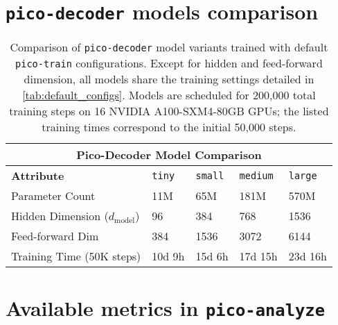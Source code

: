 \section{\texttt{pico-decoder} models comparison}
\begin{table}[h!]
\centering
\renewcommand{\arraystretch}{1}
\begin{tabular}{|p{}||p{}|p{}|p{}|p{}|}
\hline
\multicolumn{5}{|c|}{\textbf{Pico-Decoder Model Comparison}} \\
\hline
\textbf{Attribute} & \texttt{tiny} & \texttt{small} & \texttt{medium} & \texttt{large} \\
\hline
Parameter Count & 11M & 65M & 181M & 570M \\
Hidden Dimension ($d_{\text{model}}$) & 96 & 384 & 768 & 1536 \\
Feed-forward Dim & 384 & 1536 & 3072 & 6144 \\
Training Time (50K steps) & 10d 9h & 15d 6h & 17d 15h & 23d 16h \\
\hline
\end{tabular}
\vspace{0.5em}
\caption{Comparison of \texttt{pico-decoder} model variants trained with default \texttt{pico-train} configurations. Except for hidden and feed-forward dimension, all models share the training settings detailed in \cref{tab:default_configs}. Models are scheduled for 200,000 total training steps on 16 NVIDIA A100-SXM4-80GB GPUs; the listed training times correspond to the initial 50,000 steps.}
\label{tab:pico-decoder-configs}
\end{table}


\section{Available metrics in \texttt{pico-analyze}}

